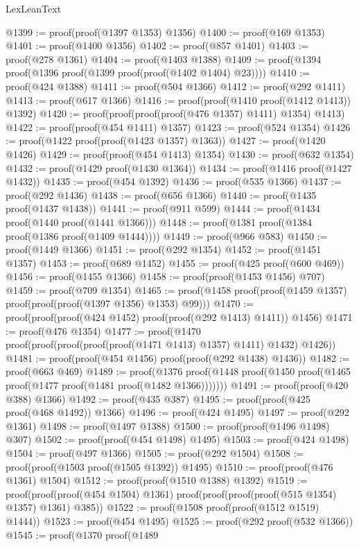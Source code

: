 \begin{lexlean}{LexLeanText}
\begin{coremodule}
@1399 := proof(proof(@1397 @1353) @1356)
@1400 := proof(@169 @1353)
@1401 := proof(@1400 @1356)
@1402 := proof(@857 @1401)
@1403 := proof(@278 @1361)
@1404 := proof(@1403 @1388)
@1409 := proof(@1394 proof(@1396 proof(@1399 proof(proof(@1402 @1404) @23))))
@1410 := proof(@424 @1388)
@1411 := proof(@504 @1366)
@1412 := proof(@292 @1411)
@1413 := proof(@617 @1366)
@1416 := proof(proof(@1410 proof(@1412 @1413)) @1392)
@1420 := proof(proof(proof(proof(@476 @1357) @1411) @1354) @1413)
@1422 := proof(proof(@454 @1411) @1357)
@1423 := proof(@524 @1354)
@1426 := proof(@1422 proof(proof(@1423 @1357) @1363))
@1427 := proof(@1420 @1426)
@1429 := proof(proof(@454 @1413) @1354)
@1430 := proof(@632 @1354)
@1432 := proof(@1429 proof(@1430 @1364))
@1434 := proof(@1416 proof(@1427 @1432))
@1435 := proof(@454 @1392)
@1436 := proof(@535 @1366)
@1437 := proof(@292 @1436)
@1438 := proof(@656 @1366)
@1440 := proof(@1435 proof(@1437 @1438))
@1441 := proof(@911 @599)
@1444 := proof(@1434 proof(@1440 proof(@1441 @1366)))
@1448 := proof(@1381 proof(@1384 proof(@1386 proof(@1409 @1444))))
@1449 := proof(@966 @583)
@1450 := proof(@1449 @1366)
@1451 := proof(@292 @1354)
@1452 := proof(@1451 @1357)
@1453 := proof(@689 @1452)
@1455 := proof(@425 proof(@600 @469))
@1456 := proof(@1455 @1366)
@1458 := proof(proof(@1453 @1456) @707)
@1459 := proof(@709 @1354)
@1465 := proof(@1458 proof(proof(@1459 @1357) proof(proof(proof(@1397 @1356) @1353) @99)))
@1470 := proof(proof(proof(@424 @1452) proof(proof(@292 @1413) @1411)) @1456)
@1471 := proof(@476 @1354)
@1477 := proof(@1470 proof(proof(proof(proof(proof(@1471 @1413) @1357) @1411) @1432) @1426))
@1481 := proof(proof(@454 @1456) proof(proof(@292 @1438) @1436))
@1482 := proof(@663 @469)
@1489 := proof(@1376
      proof(@1448 proof(@1450 proof(@1465 proof(@1477 proof(@1481 proof(@1482 @1366)))))))
@1491 := proof(proof(@420 @388) @1366)
@1492 := proof(@435 @387)
@1495 := proof(proof(@425 proof(@468 @1492)) @1366)
@1496 := proof(@424 @1495)
@1497 := proof(@292 @1361)
@1498 := proof(@1497 @1388)
@1500 := proof(proof(@1496 @1498) @307)
@1502 := proof(proof(@454 @1498) @1495)
@1503 := proof(@424 @1498)
@1504 := proof(@497 @1366)
@1505 := proof(@292 @1504)
@1508 := proof(proof(@1503 proof(@1505 @1392)) @1495)
@1510 := proof(proof(@476 @1361) @1504)
@1512 := proof(proof(@1510 @1388) @1392)
@1519 := proof(proof(proof(@454 @1504) @1361)
      proof(proof(proof(proof(@515 @1354) @1357) @1361) @385))
@1522 := proof(@1508 proof(proof(@1512 @1519) @1444))
@1523 := proof(@454 @1495)
@1525 := proof(@292 proof(@532 @1366))
@1545 := proof(@1370
      proof(@1489

\end{coremodule}
\end{lexlean}
